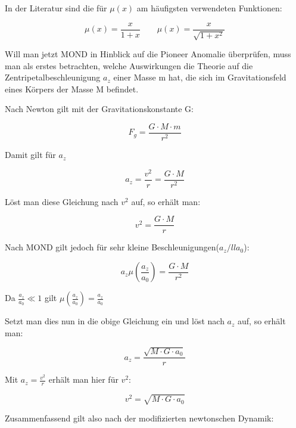 In der Literatur sind die f\"ur $\mu (x)$ am h\"aufigsten verwendeten
Funktionen:

\begin{equation*}
\mu (x)=\frac{x}{1+x}
\qquad
\mu (x)=\frac{x}{\sqrt{1+x^{2}}}
\end{equation*}

Will man jetzt MOND in Hinblick auf die Pioneer Anomalie \cite{Turyshev2010}
\"uberpr\"ufen, muss man als erstes betrachten, welche Auswirkungen die
Theorie auf die Zentripetalbeschleunigung $a_{z}$ einer Masse m hat,
die sich im Gravitationsfeld eines K\"orpers der Masse M befindet.

Nach Newton gilt mit der Gravitationskonstante G:

\begin{equation}
F_{g}=\frac{G\cdot {M\cdot m}}{r^{2}}
\end{equation}

Damit gilt f\"ur $a_{z}$

\begin{equation}
a_{z}=\frac{v^{2}}{r}=\frac{G\cdot {M}}{r^{2}}
\end{equation}

L\"ost man diese Gleichung nach $v^{2}$ auf, so erh\"alt man:

\begin{equation}
v^{2}=\frac{G\cdot M}{r}
\end{equation}

Nach MOND gilt jedoch f\"ur sehr kleine Beschleunigungen($a_z /ll a_0$):

\begin{equation}
a_{z}\mu (\frac{a_{z}}{a_{0}})=\frac{G\cdot {M}}{r^{2}}
\end{equation}

Da $\frac{a_{z}}{a_{0}}\ll 1$ gilt $\mu
(\frac{a_{z}}{a_{0}})=\frac{a_{z}}{a_{0}}$

Setzt man dies nun in die obige Gleichung ein und l\"ost nach $a_{z}$
auf, so erh\"alt man:

\begin{equation}
a_{z}=\frac{\sqrt{M\cdot G\cdot a_{0}}}{r}
\end{equation}

Mit $a_{z}=\frac{v^{2}}{r}$ erh\"alt man hier f\"ur $v^{2}$:

\begin{equation}
v^{2}=\sqrt{M\cdot G\cdot a_{0}}
\end{equation}

Zusammenfassend gilt also nach der modifizierten newtonschen Dynamik:

